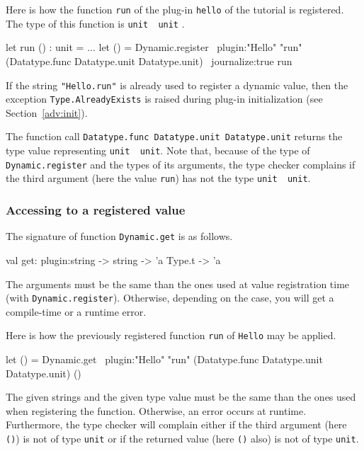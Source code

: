 \begin{example}
  Here is how the function \texttt{run} of the plug-in
  \texttt{hello} of the tutorial is registered. The type of this function is
  \texttt{unit \fl~unit}%
  .
\begin{ocamlcode}
let run () : unit = ...
let () =
  Dynamic.register 
    ~plugin:"Hello" 
    "run" 
    (Datatype.func Datatype.unit Datatype.unit)
    ~journalize:true
    run
\end{ocamlcode}
If the string \texttt{"Hello.run"} is already used to register a
dynamic value, then the exception
\texttt{Type.AlreadyExists} is raised during
plug-in initialization (see Section~\ref{adv:init}).

The function call \texttt{Datatype.func Datatype.unit Datatype.unit} returns the
type value representing \texttt{unit \fl~unit}. Note that,
because of the type of \texttt{Dynamic.register} and the types of its arguments,
the \caml type checker complains if the third argument (here the value
\texttt{run}) has not the type \texttt{unit \fl~unit}.
\end{example}

\subsubsection{Accessing to a registered value}

The signature of function
\texttt{Dynamic.get} is as
follows.
\begin{ocamlcode}
val get: plugin:string -> string -> 'a Type.t -> 'a
\end{ocamlcode}
The arguments must be the same than the ones used at value registration time
(with \texttt{Dynamic.register}). Otherwise,
depending on the case, you will get a compile-time or a runtime error.

\begin{example}
  Here is how the previously registered function \texttt{run} of
  \texttt{Hello} may be applied.
\begin{ocamlcode}
let () = 
  Dynamic.get
    ~plugin:"Hello" 
    "run" 
    (Datatype.func Datatype.unit Datatype.unit) 
    ()
\end{ocamlcode}
The given strings and the given type value must be the same
than the ones used when registering the function. Otherwise, an error occurs at
runtime. Furthermore, the \caml type checker will complain either if the third
argument (here \texttt{()}) is not of type \texttt{unit} or if the returned
value (here \texttt{()} also) is not of type \texttt{unit}.
\end{example}

